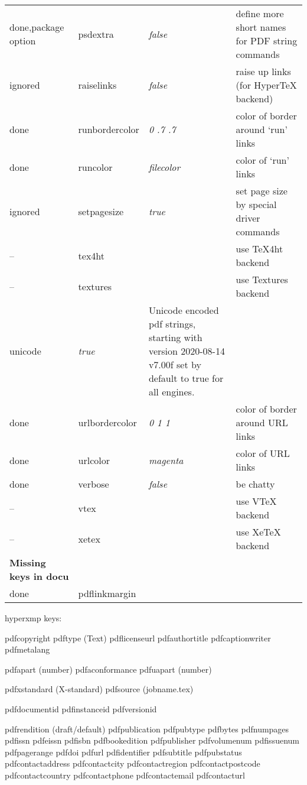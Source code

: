 \begin{longtable}{@{}l>{\ttfamily}llp{7cm}@{}}
done,package option& psdextra           & \textit{false}         & define more short names for PDF string commands \\
ignored & raiselinks         & \textit{false}         & raise up links (for \textsf{Hyper\TeX} backend) \\
done & runbordercolor     & \textit{0 .7 .7}       & color of border around `run' links \\
done & runcolor           & \textit{filecolor}     & color of `run' links\\
ignored &setpagesize        & \textit{true}          & set page size by special driver commands \\
-- & tex4ht             &                        & use \textsf{\TeX4ht} backend \\
-- & textures           &                        & use \textsf{Textures} backend \\
unicode            & \textit{true}          & Unicode encoded pdf strings, starting with version  2020-08-14 v7.00f set by default to true for all engines. \\
done & urlbordercolor     & \textit{0 1 1}         & color of border around URL links \\
done & urlcolor           & \textit{magenta}       & color of URL links \\
done & verbose            & \textit{false}         & be chatty \\
-- & vtex               &                        & use \textsf{VTeX} backend\\
-- & xetex              &                        & use \textsf{Xe\TeX} backend\\
\textbf{Missing keys in docu}\\
done & pdflinkmargin    &
\end{longtable}

hyperxmp keys:

pdfcopyright
pdftype   (Text)
pdflicenseurl
pdfauthortitle
pdfcaptionwriter
pdfmetalang

pdfapart  (number)
pdfaconformance
pdfuapart (number)

pdfxstandard  (X-standard)
pdfsource (jobname.tex)

pdfdocumentid
pdfinstanceid
pdfversionid

pdfrendition (draft/default)
pdfpublication
pdfpubtype
pdfbytes
pdfnumpages
pdfissn
pdfeissn
pdfisbn
pdfbookedition
pdfpublisher
pdfvolumenum
pdfissuenum
pdfpagerange
pdfdoi
pdfurl
pdfidentifier
pdfsubtitle
pdfpubstatus
pdfcontactaddress
pdfcontactcity
pdfcontactregion
pdfcontactpostcode
pdfcontactcountry
pdfcontactphone
pdfcontactemail
pdfcontacturl

